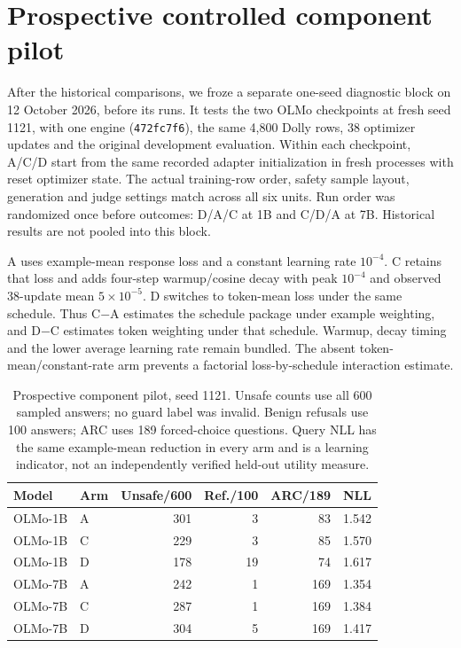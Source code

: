 \documentclass[11pt]{article}
\begin{document}
\FloatBarrier
\section{Prospective controlled component pilot}
\label{app:components}

After the historical comparisons, we froze a separate one-seed diagnostic
block on 12 October 2026, before its runs. It tests the two OLMo checkpoints
at fresh seed 1121, with one engine (\texttt{472fc7f6}), the same 4,800 Dolly
rows, 38 optimizer updates and the original development evaluation. Within
each checkpoint, A/C/D start from the same recorded adapter initialization
in fresh processes with reset optimizer state. The actual training-row order,
safety sample layout, generation and judge settings match across all six
units. Run order was randomized once before outcomes: D/A/C at 1B and C/D/A
at 7B. Historical results are not pooled into this block.

A uses example-mean response loss and a constant learning rate $10^{-4}$.
C retains that loss and adds four-step warmup/cosine decay with peak
$10^{-4}$ and observed 38-update mean $5\times10^{-5}$. D switches to
token-mean loss under the same schedule. Thus C$-$A estimates the schedule
package under example weighting, and D$-$C estimates token weighting under
that schedule. Warmup, decay timing and the lower average learning rate
remain bundled. The absent token-mean/constant-rate arm prevents a factorial
loss-by-schedule interaction estimate.

\begin{table}[t]
  \caption{Prospective component pilot, seed 1121. Unsafe counts use all
    600 sampled answers; no guard label was invalid. Benign refusals use
    100 answers; ARC uses 189 forced-choice questions. Query NLL has the
    same example-mean reduction in every arm and is a learning indicator,
    not an independently verified held-out utility measure.}
  \label{tab:components}
  \centering\footnotesize
  \setlength{\tabcolsep}{3pt}
  \begin{tabular}{@{}llrrrr@{}}
    \toprule
    Model & Arm & Unsafe/600 & Ref./100 & ARC/189 & NLL \\
    \midrule
    OLMo-1B & A & 301 & 3 & 83 & 1.542 \\
    OLMo-1B & C & 229 & 3 & 85 & 1.570 \\
    OLMo-1B & D & 178 & 19 & 74 & 1.617 \\
    OLMo-7B & A & 242 & 1 & 169 & 1.354 \\
    OLMo-7B & C & 287 & 1 & 169 & 1.384 \\
    OLMo-7B & D & 304 & 5 & 169 & 1.417 \\
    \bottomrule
  \end{tabular}
\end{table}
\end{document}
